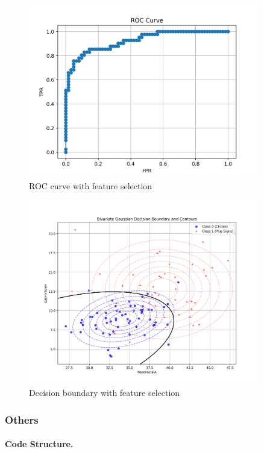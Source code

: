 \documentclass[12pt,a4paper]{article}
\begin{document}
\begin{figure}[H]
    \centering
    \includegraphics[width=0.9\textwidth]{src/roc_curve.png}
    \caption{ROC curve with feature selection}
    \label{fig:roc_fs}
\end{figure}

\begin{figure}[H]
    \centering
    \includegraphics[width=0.9\textwidth]{src/decision_boundary_plot.png}
    \caption{Decision boundary with feature selection}
    \label{decision_boundary_fs}
\end{figure}

\subsubsection{Others}
\paragraph{Code Structure.}
\end{document}
